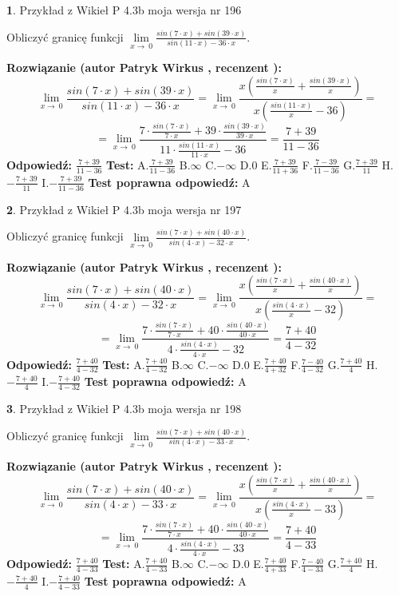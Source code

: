 \documentclass[12pt, a4paper]{article}
\theoremstyle{definition} %
\newtheorem{zad}{}
\newcommand{\zadStart}[1]{\begin{zad}#1\newline}
\newcommand{\zadStop}{\end{zad}}
\newcommand{\rozwStart}[2]{\noindent \textbf{Rozwiązanie (autor #1 , recenzent #2): }\newline}
\newcommand{\rozwStop}{\newline}
\newcommand{\odpStart}{\noindent \textbf{Odpowiedź:}\newline}
\newcommand{\odpStop}{\newline}
\newcommand{\testStart}{\noindent \textbf{Test:}\newline}
\newcommand{\testStop}{\newline}
\newcommand{\kluczStart}{\noindent \textbf{Test poprawna odpowiedź:}\newline}
\newcommand{\kluczStop}{\newline}
\begin{document}
\zadStart{Przykład z Wikieł P 4.3b moja wersja nr 196}


Obliczyć granicę funkcji $\lim\limits_{x\to\ 0}\frac{sin(7 \cdot x)+sin(39 \cdot x)}{sin(11 \cdot x)-36 \cdot x}$.
\zadStop
\rozwStart{Patryk Wirkus}{}
$$\lim\limits_{x\to\ 0}\frac{sin(7 \cdot x)+sin(39 \cdot x)}{sin(11 \cdot x)-36 \cdot x}=\lim\limits_{x\to\ 0}\frac{x(\frac{sin(7 \cdot x)}{x}+\frac{sin(39 \cdot x)}{x})}{x(\frac{sin(11 \cdot x)}{x}-36)}=$$
$$=\lim\limits_{x\to\ 0}\frac{7 \cdot \frac{sin(7 \cdot x)}{7 \cdot x}+39 \cdot \frac{sin(39 \cdot x)}{39 \cdot x}}{11 \cdot \frac{sin(11 \cdot x)}{11 \cdot x}-36}=\frac{7+39}{11-36}$$
\rozwStop
\odpStart
$\frac{7+39}{11-36}$
\odpStop
\testStart
A.$\frac{7+39}{11-36}$
B.$\infty$
C.$-\infty$
D.$0$
E.$\frac{7+39}{11+36}$
F.$\frac{7-39}{11-36}$
G.$\frac{7+39}{11}$
H.$-\frac{7+39}{11}$
I.$-\frac{7+39}{11-36}$
\testStop
\kluczStart
A
\kluczStop



\zadStart{Przykład z Wikieł P 4.3b moja wersja nr 197}


Obliczyć granicę funkcji $\lim\limits_{x\to\ 0}\frac{sin(7 \cdot x)+sin(40 \cdot x)}{sin(4 \cdot x)-32 \cdot x}$.
\zadStop
\rozwStart{Patryk Wirkus}{}
$$\lim\limits_{x\to\ 0}\frac{sin(7 \cdot x)+sin(40 \cdot x)}{sin(4 \cdot x)-32 \cdot x}=\lim\limits_{x\to\ 0}\frac{x(\frac{sin(7 \cdot x)}{x}+\frac{sin(40 \cdot x)}{x})}{x(\frac{sin(4 \cdot x)}{x}-32)}=$$
$$=\lim\limits_{x\to\ 0}\frac{7 \cdot \frac{sin(7 \cdot x)}{7 \cdot x}+40 \cdot \frac{sin(40 \cdot x)}{40 \cdot x}}{4 \cdot \frac{sin(4 \cdot x)}{4 \cdot x}-32}=\frac{7+40}{4-32}$$
\rozwStop
\odpStart
$\frac{7+40}{4-32}$
\odpStop
\testStart
A.$\frac{7+40}{4-32}$
B.$\infty$
C.$-\infty$
D.$0$
E.$\frac{7+40}{4+32}$
F.$\frac{7-40}{4-32}$
G.$\frac{7+40}{4}$
H.$-\frac{7+40}{4}$
I.$-\frac{7+40}{4-32}$
\testStop
\kluczStart
A
\kluczStop



\zadStart{Przykład z Wikieł P 4.3b moja wersja nr 198}


Obliczyć granicę funkcji $\lim\limits_{x\to\ 0}\frac{sin(7 \cdot x)+sin(40 \cdot x)}{sin(4 \cdot x)-33 \cdot x}$.
\zadStop
\rozwStart{Patryk Wirkus}{}
$$\lim\limits_{x\to\ 0}\frac{sin(7 \cdot x)+sin(40 \cdot x)}{sin(4 \cdot x)-33 \cdot x}=\lim\limits_{x\to\ 0}\frac{x(\frac{sin(7 \cdot x)}{x}+\frac{sin(40 \cdot x)}{x})}{x(\frac{sin(4 \cdot x)}{x}-33)}=$$
$$=\lim\limits_{x\to\ 0}\frac{7 \cdot \frac{sin(7 \cdot x)}{7 \cdot x}+40 \cdot \frac{sin(40 \cdot x)}{40 \cdot x}}{4 \cdot \frac{sin(4 \cdot x)}{4 \cdot x}-33}=\frac{7+40}{4-33}$$
\rozwStop
\odpStart
$\frac{7+40}{4-33}$
\odpStop
\testStart
A.$\frac{7+40}{4-33}$
B.$\infty$
C.$-\infty$
D.$0$
E.$\frac{7+40}{4+33}$
F.$\frac{7-40}{4-33}$
G.$\frac{7+40}{4}$
H.$-\frac{7+40}{4}$
I.$-\frac{7+40}{4-33}$
\testStop
\kluczStart
A
\kluczStop
\end{document}
